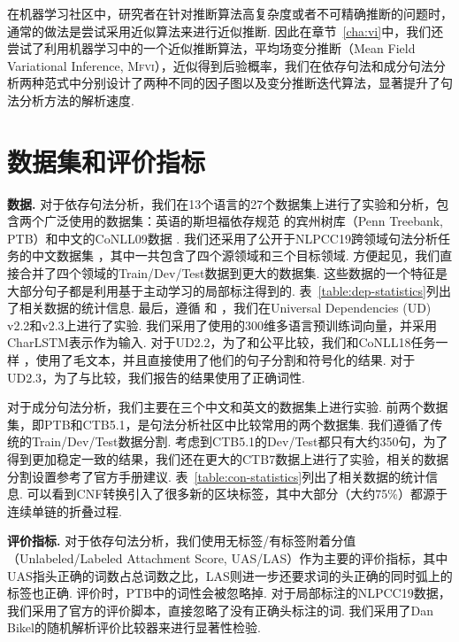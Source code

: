 在机器学习社区中，研究者在针对推断算法高复杂度或者不可精确推断的问题时，通常的做法是尝试采用近似算法来进行近似推断.
因此在章节~\ref{cha:vi}中，我们还尝试了利用机器学习中的一个近似推断算法，平均场变分推断（Mean Field Variational Inference, \textsc{Mfvi}），近似得到后验概率，我们在依存句法和成分句法分析两种范式中分别设计了两种不同的因子图以及变分推断迭代算法，显著提升了句法分析方法的解析速度.

\section{数据集和评价指标}



\noindent\textbf{数据.}
对于依存句法分析，我们在13个语言的27个数据集上进行了实验和分析，包含两个广泛使用的数据集：英语的斯坦福依存规范 \citep{chen-manning-2014-fast}的宾州树库（Penn Treebank, PTB）和中文的CoNLL09数据 \citep{hajic-etal-2009-conll}.
我们还采用了公开于NLPCC19跨领域句法分析任务的中文数据集 \citep{peng-etal-2019-overview}，其中一共包含了四个源领域和三个目标领域.
方便起见，我们直接合并了四个领域的Train/Dev/Test数据到更大的数据集.
这些数据的一个特征是大部分句子都是利用基于主动学习的局部标注得到的.
表~\ref{table:dep-statistics}列出了相关数据的统计信息.
最后，遵循 \citep{ji-etal-2019-graph}和 \citep{zhang-etal-2019-empirical}，我们在Universal Dependencies (UD) v2.2和v2.3上进行了实验.
我们采用了\citet{zeman-etal-2018-conll}使用的300维多语言预训练词向量，并采用CharLSTM表示作为输入.
对于UD2.2，为了和\citet{ji-etal-2019-graph}公平比较，我们和CoNLL18任务一样 \citep{zeman-etal-2018-conll}，使用了毛文本，并且直接使用了他们的句子分割和符号化的结果.
对于UD2.3，为了与\citet{zhang-etal-2019-empirical}比较，我们报告的结果使用了正确词性.

对于成分句法分析，我们主要在三个中文和英文的数据集上进行实验.
前两个数据集，即PTB和CTB5.1，是句法分析社区中比较常用的两个数据集.
我们遵循了传统的Train/Dev/Test数据分割.
考虑到CTB5.1的Dev/Test都只有大约350句，为了得到更加稳定一致的结果，我们还在更大的CTB7数据上进行了实验，相关的数据分割设置参考了官方手册建议.
表~\ref{table:con-statistics}列出了相关数据的统计信息.
可以看到CNF转换引入了很多新的区块标签，其中大部分（大约75\%）都源于连续单链的折叠过程.



\noindent\textbf{评价指标.}
对于依存句法分析，我们使用无标签/有标签附着分值（Unlabeled/Labeled Attachment Score, UAS/LAS）作为主要的评价指标，其中UAS指头正确的词数占总词数之比，LAS则进一步还要求词的头正确的同时弧上的标签也正确.
评价时，PTB中的词性会被忽略掉.
对于局部标注的NLPCC19数据，我们采用了官方的评价脚本，直接忽略了没有正确头标注的词.
我们采用了Dan Bikel的随机解析评价比较器来进行显著性检验.

